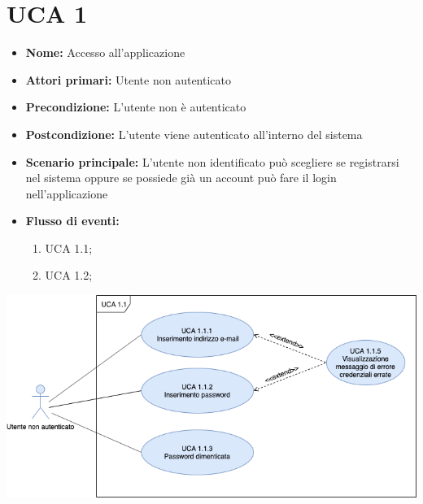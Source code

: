 \documentclass[a4paper, oneside, dvipsnames, table]{article} %
\begin{document}
\section{UCA  1}%
\begin{itemize}
\item \textbf{Nome:} Accesso all'applicazione
\item \textbf{Attori primari:} Utente non autenticato
\item \textbf{Precondizione:} L’utente non è autenticato
\item \textbf{Postcondizione:} L’utente viene autenticato all’interno del sistema 
\item \textbf{Scenario principale:} L'utente non identificato può scegliere se registrarsi nel sistema oppure se possiede già un account può fare il login nell'applicazione %
\item \textbf{Flusso di eventi:}
    \begin{enumerate}
        \item UCA 1.1;
        \item UCA 1.2;
    \end{enumerate}

\end{itemize}

\newpage
\centering\includegraphics[scale=0.4]{Login.png}
\end{document}
